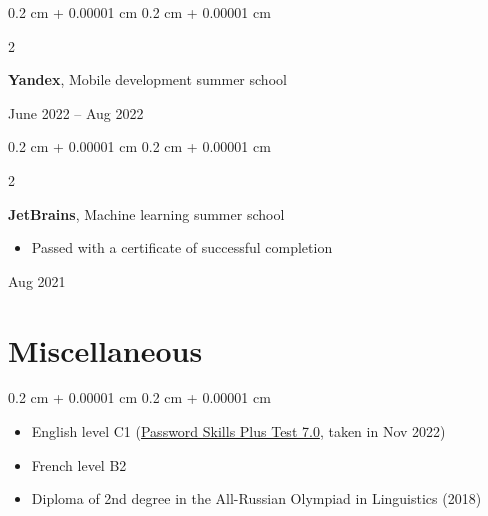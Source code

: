 \documentclass[10pt, letterpaper]{article}
\newenvironment{highlights}{
    \begin{itemize}[
        topsep=0.10 cm,
        parsep=0.10 cm,
        partopsep=0pt,
        itemsep=0pt,
        leftmargin=0.4 cm + 10pt
    ]
}{
    \end{itemize}
} %
\newenvironment{highlightsforbulletentries}{
    \begin{itemize}[
        topsep=0.10 cm,
        parsep=0.10 cm,
        partopsep=0pt,
        itemsep=0pt,
        leftmargin=10pt
    ]
}{
    \end{itemize}
} %
\newenvironment{onecolentry}{
    \begin{adjustwidth}{
        0.2 cm + 0.00001 cm
    }{
        0.2 cm + 0.00001 cm
    }
}{
    \end{adjustwidth}
} %
\newenvironment{twocolentry}[2][]{
    \onecolentry
    \def\secondColumn{#2}
    \setcolumnwidth{\fill, 4.5 cm}
    \begin{paracol}{2}
}{
    \switchcolumn \raggedleft \secondColumn
    \end{paracol}
    \endonecolentry
} %
\begin{document}
        \vspace{0.2 cm}

        \begin{twocolentry}{
            June 2022 – Aug 2022
        }
            \textbf{Yandex}, Mobile development summer school
        \end{twocolentry}


        \vspace{0.2 cm}

        \begin{twocolentry}{
            Aug 2021
        }
            \textbf{JetBrains}, Machine learning summer school
            \begin{highlights}
                \item Passed with a certificate of successful completion
            \end{highlights}
        \end{twocolentry}



    
    \section{Miscellaneous}

    \begin{onecolentry}
        \begin{highlightsforbulletentries}


        \item English level C1 (\href{https://drive.google.com/file/d/125A2hjAsJC6aRWulAMg6xOu1e6PfJCy9/view?usp=sharing}{Password Skills Plus Test 7.0}, taken in Nov 2022)

        \item French level B2

        \item Diploma of 2nd degree in the All-Russian Olympiad in Linguistics (2018)


        \end{highlightsforbulletentries}
    \end{onecolentry}
\end{document}
